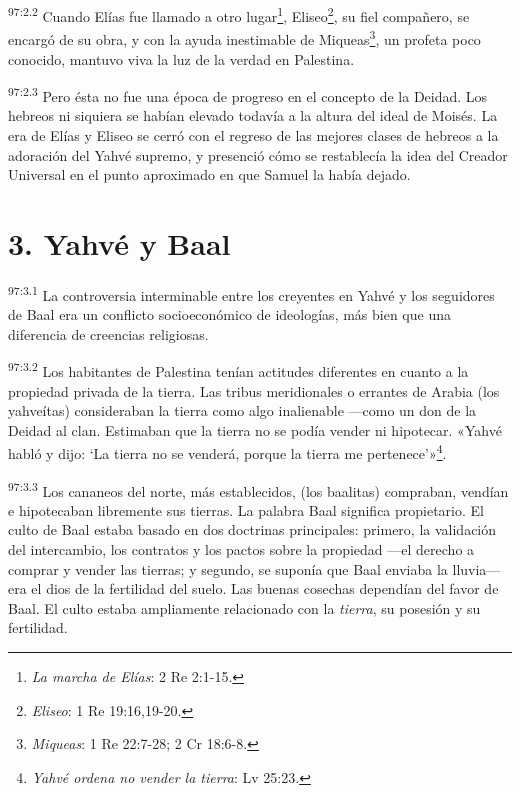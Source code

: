 \par
\textsuperscript{97:2.2} Cuando Elías fue llamado a otro lugar\footnote{\textit{La marcha de Elías}: 2 Re 2:1-15.}, Eliseo\footnote{\textit{Eliseo}: 1 Re 19:16,19-20.}, su fiel compañero, se encargó de su obra, y con la ayuda inestimable de Miqueas\footnote{\textit{Miqueas}: 1 Re 22:7-28; 2 Cr 18:6-8.}, un profeta poco conocido, mantuvo viva la luz de la verdad en Palestina.

\par
\textsuperscript{97:2.3} Pero ésta no fue una época de progreso en el concepto de la Deidad. Los hebreos ni siquiera se habían elevado todavía a la altura del ideal de Moisés. La era de Elías y Eliseo se cerró con el regreso de las mejores clases de hebreos a la adoración del Yahvé supremo, y presenció cómo se restablecía la idea del Creador Universal en el punto aproximado en que Samuel la había dejado.

\section*{3. Yahvé y Baal}
\par
\textsuperscript{97:3.1} La controversia interminable entre los creyentes en Yahvé y los seguidores de Baal era un conflicto socioeconómico de ideologías, más bien que una diferencia de creencias religiosas.

\par
\textsuperscript{97:3.2} Los habitantes de Palestina tenían actitudes diferentes en cuanto a la propiedad privada de la tierra. Las tribus meridionales o errantes de Arabia (los yahveítas) consideraban la tierra como algo inalienable ---como un don de la Deidad al clan. Estimaban que la tierra no se podía vender ni hipotecar. «Yahvé habló y dijo: `La tierra no se venderá, porque la tierra me pertenece'»\footnote{\textit{Yahvé ordena no vender la tierra}: Lv 25:23.}.

\par
\textsuperscript{97:3.3} Los cananeos del norte, más establecidos, (los baalitas) compraban, vendían e hipotecaban libremente sus tierras. La palabra Baal significa propietario. El culto de Baal estaba basado en dos doctrinas principales: primero, la validación del intercambio, los contratos y los pactos sobre la propiedad ---el derecho a comprar y vender las tierras; y segundo, se suponía que Baal enviaba la lluvia--- era el dios de la fertilidad del suelo. Las buenas cosechas dependían del favor de Baal. El culto estaba ampliamente relacionado con la \textit{tierra}, su posesión y su fertilidad.

